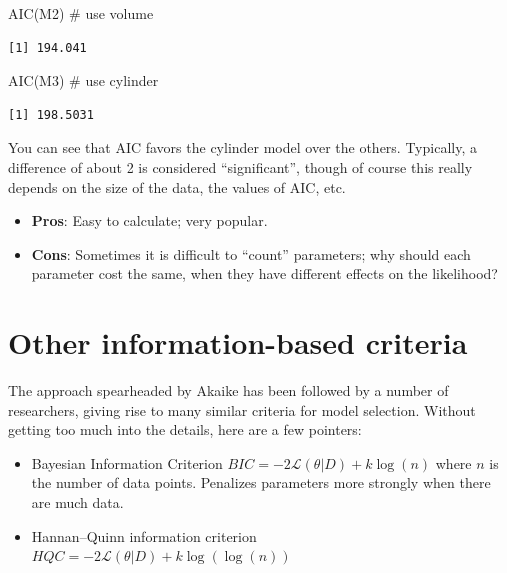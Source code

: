 \documentclass[
  letterpaper,
  DIV=11,
  numbers=noendperiod]{scrreprt}
\newenvironment{Shaded}{\begin{snugshade}}{\end{snugshade}}
\newcommand{\CommentTok}[1]{\textcolor[rgb]{0.37,0.37,0.37}{#1}}
\newcommand{\FunctionTok}[1]{\textcolor[rgb]{0.28,0.35,0.67}{#1}}
\newcommand{\NormalTok}[1]{\textcolor[rgb]{0.00,0.23,0.31}{#1}}
\providecommand{\tightlist}{%
  \setlength{\itemsep}{0pt}\setlength{\parskip}{0pt}}\usepackage{longtable,booktabs,array}
\begin{document}
\begin{Shaded}
\begin{Highlighting}[]
\FunctionTok{AIC}\NormalTok{(M2) }\CommentTok{\# use volume}
\end{Highlighting}
\end{Shaded}

\begin{verbatim}
[1] 194.041
\end{verbatim}

\begin{Shaded}
\begin{Highlighting}[]
\FunctionTok{AIC}\NormalTok{(M3) }\CommentTok{\# use cylinder}
\end{Highlighting}
\end{Shaded}

\begin{verbatim}
[1] 198.5031
\end{verbatim}

You can see that AIC favors the cylinder model over the others.
Typically, a difference of about 2 is considered ``significant'', though
of course this really depends on the size of the data, the values of
AIC, etc.

\begin{itemize}
\tightlist
\item
  \textbf{Pros}: Easy to calculate; very popular.
\item
  \textbf{Cons}: Sometimes it is difficult to ``count'' parameters; why
  should each parameter cost the same, when they have different effects
  on the likelihood?
\end{itemize}

\hypertarget{other-information-based-criteria}{%
\section{Other information-based
criteria}\label{other-information-based-criteria}}

The approach spearheaded by Akaike has been followed by a number of
researchers, giving rise to many similar criteria for model selection.
Without getting too much into the details, here are a few pointers:

\begin{itemize}
\tightlist
\item
  Bayesian Information Criterion
  \(BIC = -2 \mathcal L(\theta \vert D) + k \log(n)\) where \(n\) is the
  number of data points. Penalizes parameters more strongly when there
  are much data.
\item
  Hannan--Quinn information criterion
  \(HQC = -2 \mathcal L(\theta \vert D) + k \log(\log(n))\)
\end{itemize}
\end{document}

